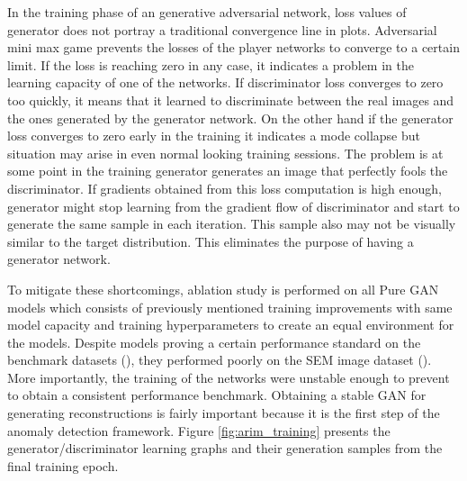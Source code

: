 In the training phase of an generative adversarial network, loss values of generator does not
portray a traditional convergence line in plots. Adversarial mini max game prevents the losses of the
player networks to converge to a certain limit. If the loss is reaching zero in any case, it
indicates a problem in the learning capacity of one of the networks. If discriminator loss converges
to zero too quickly, it means that it learned to discriminate between the real images and the ones
generated by the generator network. On the other hand if the generator loss converges to zero early
in the training  it indicates a mode collapse but situation may arise in even normal looking
training sessions. The problem is at some point in the training generator generates an image that
perfectly fools the discriminator. If gradients obtained from this loss computation is high enough,
generator might stop learning from the gradient flow of discriminator and start to generate the same
sample in each iteration. This sample also may not be visually similar to the target distribution.
This eliminates the purpose of having a generator network.

To mitigate these shortcomings, ablation study is performed on all Pure GAN models which consists of
previously mentioned training improvements with same model capacity and training hyperparameters to
create an equal environment for the models. Despite models proving a certain performance standard on
the benchmark datasets (\cite{cifar10,Netzer2011ReadingDI}), they performed poorly on the SEM image
dataset (\cite{sem}). More importantly, the training of the networks were unstable enough to prevent
to obtain a consistent performance benchmark. Obtaining a stable GAN for generating reconstructions
is fairly important because it is the first step of the anomaly detection framework. Figure
\ref{fig:arim_training} presents the generator/discriminator learning graphs and their generation
samples from the final training epoch.

